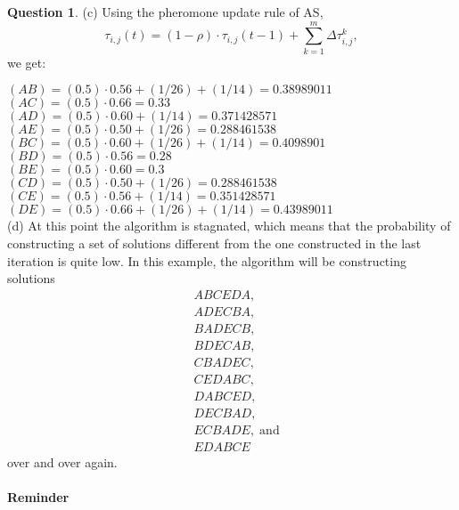 \documentclass[11pt,a4paper]{article}
\theoremstyle{definition}%
\newtheorem{Q}{Question}[] %
\begin{document}
\begin{Q}
{    (c) Using the pheromone update rule of AS, 
    $$\tau_{i,j}(t)= (1-\rho)\cdot\tau_{i,j}(t-1)+ \sum_{k=1}^{m} \Delta\tau_{i,j}^k,$$ we get:

	 $(AB) = (0.5)\cdot0.56 + (1/26)+(1/14) = 0.38989011$\\
	 $(AC) = (0.5)\cdot0.66 = 0.33$\\
	 $(AD) = (0.5)\cdot0.60 + (1/14) = 0.371428571$\\
	 $(AE) = (0.5)\cdot0.50 + (1/26) = 0.288461538$\\
	 $(BC) = (0.5)\cdot0.60 + (1/26)+(1/14) = 0.4098901$\\
	 $(BD) = (0.5)\cdot0.56 = 0.28$\\
	 $(BE) = (0.5)\cdot0.60 = 0.3 $\\
	 $(CD) = (0.5)\cdot0.50 + (1/26) = 0.288461538$\\
	 $(CE) = (0.5)\cdot0.56 + (1/14) = 0.351428571$\\
	 $(DE) = (0.5)\cdot0.66 + (1/26)+(1/14) = 0.43989011$\\
     
    (d)
	At this point the algorithm is stagnated, which means that the probability of 
    constructing a set of solutions different from the one constructed in the last 
    iteration is quite low. In this example, the algorithm will be constructing solutions
     	$$
     	\begin{aligned}
     		&ABCEDA, \\
     		&ADECBA, \\
     		&BADECB, \\
     		&BDECAB, \\
     		&CBADEC, \\
     		&CEDABC, \\
     		&DABCED, \\
     		&DECBAD, \\
     		&ECBADE, \;\mathrm{and}\\
     		&EDABCE
     	\end{aligned}
     	$$
     	over and over again.
 }

 \end{Q}

\clearpage
\paragraph{Reminder}
\end{document}
